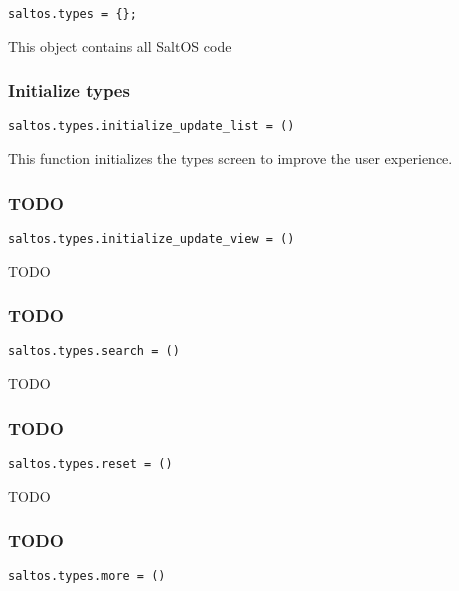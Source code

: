 \documentclass[a4paper]{article}
\begin{document}
\begin{lstlisting}
saltos.types = {};
\end{lstlisting}

This object contains all SaltOS code

\hypertarget{toc121}{}
\subsubsection{Initialize types}

\begin{lstlisting}
saltos.types.initialize_update_list = ()
\end{lstlisting}

This function initializes the types screen to improve the user experience.

\hypertarget{toc122}{}
\subsubsection{TODO}

\begin{lstlisting}
saltos.types.initialize_update_view = ()
\end{lstlisting}

TODO

\hypertarget{toc123}{}
\subsubsection{TODO}

\begin{lstlisting}
saltos.types.search = ()
\end{lstlisting}

TODO

\hypertarget{toc124}{}
\subsubsection{TODO}

\begin{lstlisting}
saltos.types.reset = ()
\end{lstlisting}

TODO

\hypertarget{toc125}{}
\subsubsection{TODO}

\begin{lstlisting}
saltos.types.more = ()
\end{lstlisting}
\end{document}
